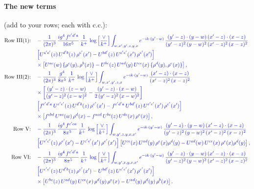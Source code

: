 \documentclass[10pt]{article}
\numberwithin{equation}{section}
\newcommand{\nc}{\color{blue}}
\newcommand{\Lv}{\log\Big[\frac{\vee}{k^+}\Big]}
\begin{document}
\paragraph{The new terms} (add to your rows; each with c.c.):
\begin{align}
\text{Row III(1):}\quad&\nc -\frac{1}{(2\pi)^{3}}\, \frac{ig^{4}\,f^{c'd'a}}{16\pi^{5}}\, \frac{1}{k^{+}}\,\Lv\int_{w,x',y',z,y,x} e^{-ik\cdot (y'-w)}\,\frac{(y'-z)\cdot (y-w)\,(x'-z)\cdot (x-z)}{(y'-z)^{2}\,(y-w)^{2}\,(x'-z)^{2}\,(x-z)^{2}}\notag \\
&\nc \left[U^{e'c'}(z)\,U^{d'b}(z)\,\rho^{e'}(x')-U^{bd'}(z)\,U^{c'e'}(x')\,\rho^{e'}(x')\right]\notag \\
&\nc \times\left[U^{ac}(w)\, \{\rho^{c}(y),\rho^{b}(x)\}-U^{bc}(z)\,U^{ad}(y)\,U^{ce}(x)\,\{\rho^{d}(y),\rho^{e}(x)\}\right],\\
\text{Row III(2):}\quad&\nc -\frac{1}{(2\pi)^{3}}\,\frac{g^{4}}{8\pi^{5}}\,\frac{1}{k^{+}}\,\Lv\int_{w,x',y',z,x} e^{-ik\cdot (y'-w)}\,\frac{(x'-z)\cdot (x-z)}{(x'-z)^{2}\,(x-z)^{2}}\notag \\
&\nc \times\bigg[\frac{(y'-z)\cdot (z-w)}{(y'-z)^{2}\,(z-w)^{2}}-\frac{(y'-z)\cdot (x-w)}{2\,(y'-z)^{2}\,(x-w)^{2}}\bigg]\notag \\
&\nc \left[f^{c'd'a}\,U^{e'c'}(z)\,U^{d'b}(z)\,\rho^{e'}(x')-f^{c'd'a}\, U^{bd'}(z)\,U^{c'e'}(x')\,\rho^{e'}(x')\right]\notag \\
&\nc \times\left[f^{cbd}\,U^{ac}(w)\,\rho^{d}(x) -f^{acd}\,U^{bc}(z)\,U^{de}(x)\,\rho^{e}(x)\right],\\
\text{Row V:}\quad&\nc -\frac{1}{(2\pi)^{3}}\, \frac{ig^{4}\,f^{c'ca}}{8\pi^{5}}\, \frac{1}{k^{+}}\,\Lv\int_{w,y',z,y,x,x'} e^{-ik\cdot (y'-w)}\,\frac{(y'-z)\cdot (y-w)\,(x'-z)\cdot (x-z)}{(y'-z)^{2}\,(y-w)^{2}\,(x'-z)^{2}\,(x-z)^{2}}\notag \\
&\nc \left[U^{e'c'}(z)\,\rho^{e'}(x')-U^{c'e'}(x')\,\rho^{e'}(x')\right]\left[U^{ce}(x)\,U^{ad}(y)\,\rho^{e}(x)\rho^{d}(y)-U^{ad}(w)\,U^{ce}(x)\,\rho^{e}(x)\rho^{d}(y)\right],\\
\text{Row VI:}\quad&\nc -\frac{1}{(2\pi)^{3}}\, \frac{ig^{4}\,f^{c'd'a}}{8\pi^{5}}\, \frac{1}{k^{+}}\,\Lv\int_{w,y',z,y,x,x'} e^{-ik\cdot (y'-w)}\,\frac{(y'-z)\cdot (y-w)\,(x'-z)\cdot (x-z)}{(y'-z)^{2}\,(y-w)^{2}\,(x'-z)^{2}\,(x-z)^{2}}\notag \\
&\nc \left[U^{e'c'}(z)\,U^{d'b}(z)\,\rho^{e'}(x')-U^{bd'}(z)\,U^{c'e'}(x')\,\rho^{e'}(x')\right]\notag \\
&\nc \times\left[U^{bc}(z)\,U^{ad}(y)\,U^{ce}(x)\,\rho^{d}(y)\,\rho^{e}(x)-U^{ad}(y)\,\rho^{d}(y)\,\rho^{b}(x)\right].
\end{align}
\end{document}
